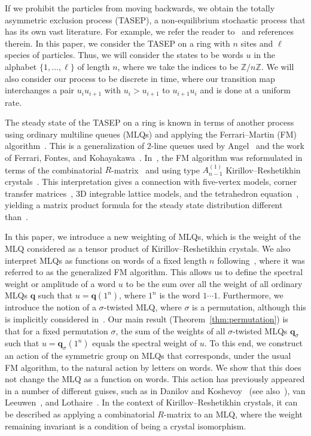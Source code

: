 \documentclass[reqno]{amsart}
\newcommand{\0}{\phantom{c}}
\newcommand{\qq}{\mathbf{q}}
\newcommand{\ZZ}{\mathbb{Z}}
\theoremstyle{plain}
\theoremstyle{definition}
\numberwithin{equation}{section}
\begin{document}
If we prohibit the particles from moving backwards, we obtain the totally asymmetric exclusion process (TASEP), a non-equilibrium stochastic process that has its own vast literature.
For example, we refer the reader to~\cite{AasLin17,AAMP,BE07,BP14,DEHP93,KMO15,KMO16,Liggett99} and references therein.
In this paper, we consider the TASEP on a ring with $n$ sites and $\ell$ species of particles.
Thus, we will consider the states to be words $u$ in the alphabet $\{1, \dotsc, \ell\}$ of length $n$, where we take the indices to be $\ZZ / n \ZZ$.
We will also consider our process to be discrete in time, where our transition map interchanges a pair $u_i u_{i+1}$ with $u_i > u_{i+1}$ to $u_{i+1} u_i$ and is done at a uniform rate.

The steady state of the TASEP on a ring is known in terms of another process using ordinary multiline queues (MLQs) and applying the Ferrari--Martin (FM) algorithm~\cite{FM06,FM07}.
This is a generalization of 2-line queues used by Angel~\cite{Angel06} and the work of Ferrari, Fontes, and Kohayakawa~\cite{FFK94}.
In~\cite{KMO15,KMO16}, the FM algorithm was reformulated in terms of the combinatorial $R$-matrix~\cite{NY97,Shimozono02} and using type $A_{n-1}^{(1)}$ Kirillov--Reshetikhin crystals~\cite{KKMMNN92}.
This interpretation gives a connection with five-vertex models, corner transfer matrices~\cite{Baxter89}, 3D integrable lattice models, and the tetrahedron equation~\cite{Zam80}, yielding a matrix product formula for the steady state distribution different than~\cite{CdGW15,EFM09,PEM09}.

In this paper, we introduce a new weighting of MLQs, which is the weight of the MLQ considered as a tensor product of Kirillov--Reshetikhin crystals.
We also interpret MLQs as functions on words of a fixed length $n$ following~\cite{AAMP}, where it was referred to as the generalized FM algorithm.
This allows us to define the spectral weight or amplitude of a word $u$ to be the sum over all the weight of all ordinary MLQs $\qq$ such that $u = \qq(1^n)$, where $1^n$ is the word $1 \dotsm 1$.
Furthermore, we introduce the notion of a $\sigma$-twisted MLQ, where $\sigma$ is a permutation, although this is implicitly considered in~\cite{AAMP}.
Our main result (Theorem~\ref{thm:permutation}) is that for a fixed permutation $\sigma$, the sum of the weights of all $\sigma$-twisted MLQs $\qq_{\sigma}$ such that $u = \qq_{\sigma}(1^n)$ equals the spectral weight of $u$.
To this end, we construct an action of the symmetric group on MLQs that corresponds, under the usual FM algorithm, to the natural action by letters on words.
We show that this does not change the MLQ as a function on words.
This action has previously appeared in a number of different guises, such as in Danilov and Koshevoy~\cite{DanilovKoshevoy} (see also~\cite[Ch.~4]{Gorodentsev2}), van Leeuwen~\cite[Lemma~2.3]{vanLeeuwen-dc}, and Lothaire~\cite[Ch.~5, (5.6.3)]{Loth}.
In the context of Kirillov--Reshetikhin crystals, it can be described as applying a combinatorial $R$-matrix to an MLQ, where the weight remaining invariant is a condition of being a crystal isomorphism.
\end{document}
